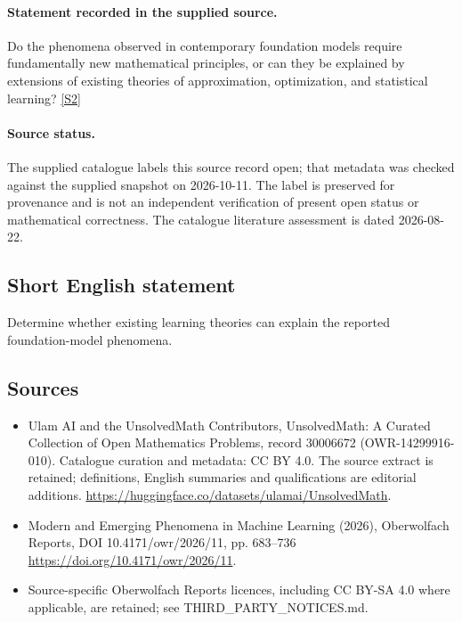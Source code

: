 \documentclass[11pt]{article}
\begin{document}
\paragraph{Statement recorded in the supplied source.}
Do the phenomena observed in contemporary foundation models require fundamentally new mathematical principles, or can they be explained by extensions of existing theories of approximation, optimization, and statistical learning? \href{https://doi.org/10.4171/owr/2026/11}{[S2]}
\paragraph{Source status.}
The supplied catalogue labels this source record open; that metadata was checked against the supplied snapshot on 2026-10-11. The label is preserved for provenance and is not an independent verification of present open status or mathematical correctness. The catalogue literature assessment is dated 2026-08-22.
\subsection{Short English statement}
Determine whether existing learning theories can explain the reported foundation-model phenomena.
\subsection{Sources}
\begin{itemize}
\item[S1] Ulam AI and the UnsolvedMath Contributors, UnsolvedMath: A Curated Collection of Open Mathematics Problems, record 30006672 (OWR-14299916-010). Catalogue curation and metadata: CC BY 4.0. The source extract is retained; definitions, English summaries and qualifications are editorial additions.
\url{https://huggingface.co/datasets/ulamai/UnsolvedMath}.
\item[S2] Modern and Emerging Phenomena in Machine Learning (2026), Oberwolfach Reports, DOI 10.4171/owr/2026/11, pp. 683--736
\url{https://doi.org/10.4171/owr/2026/11}.
\item Source-specific Oberwolfach Reports licences, including CC BY-SA 4.0 where applicable, are retained; see THIRD\_PARTY\_NOTICES.md.
\end{itemize}
\end{document}
